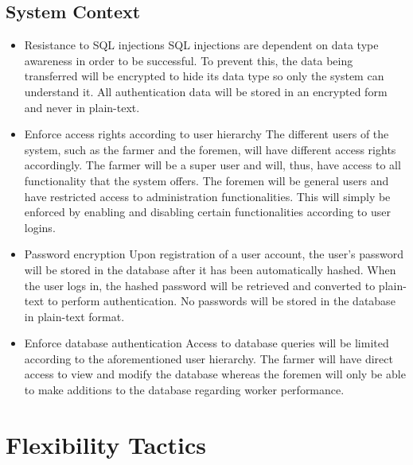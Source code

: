 \documentclass[11pt,fleqn]{book} %
\begin{document}
	\subsection{System Context}
	\begin{itemize}
		\item Resistance to SQL injections\newline\newline
		SQL injections are dependent on data type awareness in order to be successful. To prevent this, the data being transferred will be encrypted to hide its data type so only the system can understand it. All authentication data will be stored in an encrypted form and never in plain-text.\newline
		
		\item Enforce access rights according to user hierarchy \newline\newline
		The different users of the system, such as the farmer and the foremen, will have different access rights accordingly. The farmer will be a super user and will, thus, have access to all functionality that the system offers. The foremen will be general users and have restricted access to administration functionalities. This will simply be enforced by enabling and disabling certain functionalities according to user logins.\newline
		
		\item Password encryption\newline\newline
		Upon registration of a user account, the user’s password will be stored in the database after it has been automatically hashed. When the user logs in, the hashed password will be retrieved and converted to plain-text to perform authentication. No passwords will be stored in the database in plain-text format.\newline
		
		\item Enforce database authentication\newline\newline
		Access to database queries will be limited according to the aforementioned user hierarchy. The farmer will have direct access to view and modify the database whereas the foremen will only be able to make additions to the database regarding worker performance.			
	\end{itemize}
	\section{Flexibility Tactics}
\end{document}
